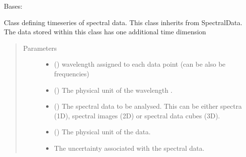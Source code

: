 \documentclass[a4paper,10pt,english]{sphinxmanual}
\begin{document}

\begin{fulllineitems}
\label{\detokenize{cascade.data_model:cascade.data_model.data_model.SpectralDataTimeSeries}}
Bases: {\hyperref[\detokenize{cascade.data_model:cascade.data_model.data_model.SpectralData}]{}}

Class defining timeseries of spectral data. This class inherits from
SpectralData. The data stored within this class has one additional
time dimension
\begin{quote}\begin{description}
\item[{Parameters}] \leavevmode\begin{itemize}
\item {} 
 () \textendash{} wavelength assigned to each data point (can be also be frequencies)

\item {} 
 () \textendash{} The physical unit of the wavelength .

\item {} 
 () \textendash{} The spectral data to be analysed. This can be either spectra (1D),
spectral images (2D) or spectral data cubes (3D).

\item {} 
 () \textendash{} The physical unit of the data.

\item {} 
 \textendash{} The uncertainty associated with the spectral data.


\end{itemize}
\end{description}
\end{quote}
\end{fulllineitems}
\end{document}
